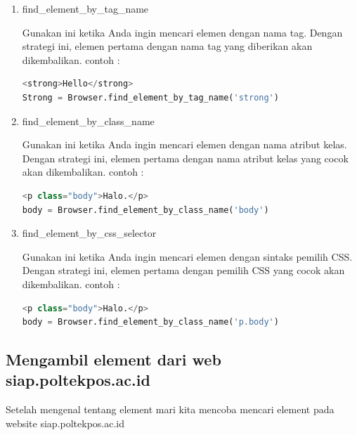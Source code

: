 \begin{enumerate}
\item find_element_by_tag_name
\par Gunakan ini ketika Anda ingin mencari elemen dengan nama tag. Dengan strategi ini, elemen pertama dengan nama tag yang diberikan akan dikembalikan.
contoh :
\begin{lstlisting}[language=Python]
<strong>Hello</strong> 
Strong = Browser.find_element_by_tag_name('strong')
\end{lstlisting}

\item find_element_by_class_name
\par Gunakan ini ketika Anda ingin mencari elemen dengan nama atribut kelas. Dengan strategi ini, elemen pertama dengan nama atribut kelas yang cocok akan dikembalikan. 
contoh :
\begin{lstlisting}[language=Python]
<p class="body">Halo.</p>
body = Browser.find_element_by_class_name('body')
\end{lstlisting}

\item find_element_by_css_selector
\par Gunakan ini ketika Anda ingin mencari elemen dengan sintaks pemilih CSS. Dengan strategi ini, elemen pertama dengan pemilih CSS yang cocok akan dikembalikan. 
contoh : 
\begin{lstlisting}[language=Python]
<p class="body">Halo.</p> 
body = Browser.find_element_by_class_name('p.body')
\end{lstlisting}

\end{enumerate}

\subsection{Mengambil element dari web siap.poltekpos.ac.id}
\par Setelah mengenal tentang element mari kita mencoba mencari element pada website siap.poltekpos.ac.id

\newpage


